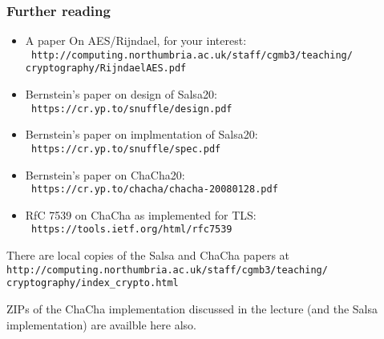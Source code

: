 \documentclass[10pt, hyperref={pdfpagelabels=false}]{beamer}
\begin{document}
\begin{frame}
\frametitle{Further reading}
\begin{itemize}
\item A paper On AES/Rijndael, for your interest:\\\texttt{\small\color{blue} http://computing.northumbria.ac.uk/staff/cgmb3/teaching/\\cryptography/RijndaelAES.pdf}
\item Bernstein's paper on design of Salsa20: \\\texttt{\small\color{blue} https://cr.yp.to/snuffle/design.pdf}
\item Bernstein's paper on implmentation of Salsa20: \\\texttt{\small\color{blue} https://cr.yp.to/snuffle/spec.pdf}
\item Bernstein's paper on ChaCha20: \\\texttt{\small\color{blue} https://cr.yp.to/chacha/chacha-20080128.pdf}
\item RfC 7539 on ChaCha as implemented for TLS:  \\\texttt{\small\color{blue} https://tools.ietf.org/html/rfc7539}
\end{itemize}
There are local copies of the Salsa and ChaCha papers at \texttt{\small\color{blue} http://computing.northumbria.ac.uk/staff/cgmb3/teaching/\\cryptography/index\_crypto.html}

ZIPs of the ChaCha implementation discussed in the lecture (and the Salsa implementation) are availble here also.
\end{frame}
\end{document}
